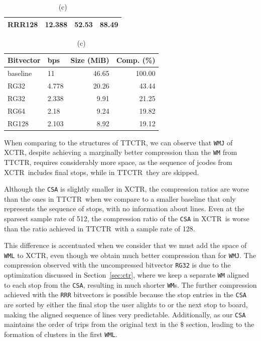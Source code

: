 \documentclass[runningheads]{llncs}
\newcommand{\ctr}{XCTR}
\newcommand{\ttctr}{TTCTR}
\begin{document}
\begin{table}
\begin{subtable}[t]{.48\linewidth}
\begin{tabular}[t]{|l|l|r|r|}
        RRR128 & 12.388 & 52.53 & 88.49 \\
        \hline
    \end{tabular}
    \end{subtable}
    \begin{subtable}[t]{.48\linewidth}
    \vspace{-12pt}
    \caption{\footnotesize (c)}
    \vspace{-12pt}
    \begin{tabular}[t]{|l|l|r|r|}
        \hline
        Bitvector & bps & Size (MiB) & Comp. (\%) \\
         \hline
        baseline & 11 & 46.65 & 100.00 \\
        RG32 & 4.778 & 20.26 & 43.44 \\
        RG32 & 2.338 & 9.91 & 21.25 \\
        RG64 & 2.18 & 9.24 & 19.82 \\
        RG128 & 2.103 & 8.92 & 19.12 \\
        \hline
    \end{tabular}
    \end{subtable}%
\end{table}

When comparing to the structures of \ttctr, we can observe that \texttt{WMJ} of \ctr, despite achieving a marginally better compression than the \texttt{WM} from \ttctr, requires considerably more space, as the sequence of jcodes from \ctr~includes final stops, while in \ttctr~they are skipped.

Although the \texttt{CSA} is slightly smaller in \ctr, the compression ratios are worse than the ones in \ttctr~when we compare to a smaller baseline that only represents the sequence of stops, with no information about lines. Even at the sparsest sample rate of 512, the compression ratio of the \texttt{CSA} in \ctr~is worse than the ratio achieved in \ttctr~with a sample rate of 128.

This difference is accentuated when we consider that we must add the space of \texttt{WML} to \ctr, even though we obtain much better compression than for \texttt{WMJ}. The compression observed with the uncompressed bitvector \texttt{RG32} is due to the optimization discussed in Section~\ref{sec:ctr}, where we keep a separate \texttt{WM} aligned to each stop from the \texttt{CSA}, resulting in much shorter \texttt{WM}s. The further compression achieved with the \texttt{RRR} bitvectors is possible because the stop entries in the \texttt{CSA} are sorted by either the final stop the user alights to or the next stop to board, making the aligned sequence of lines very predictable. Additionally, as our \texttt{CSA} maintains the order of trips from the original text in the $\$$ section, leading to the formation of clusters in the first \texttt{WML}.
\end{document}
